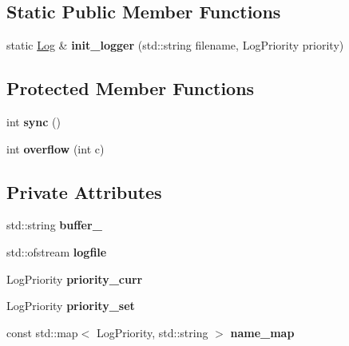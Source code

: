 \subsection*{Static Public Member Functions}
\begin{DoxyCompactItemize}
\item 
\hypertarget{classfv_1_1util_1_1Log_a8232233797affe8abc97d4b6e0b3b917}{}\label{classfv_1_1util_1_1Log_a8232233797affe8abc97d4b6e0b3b917} 
static \hyperlink{classfv_1_1util_1_1Log}{Log} \& {\bfseries init\+\_\+logger} (std\+::string filename, Log\+Priority priority)
\end{DoxyCompactItemize}
\subsection*{Protected Member Functions}
\begin{DoxyCompactItemize}
\item 
\hypertarget{classfv_1_1util_1_1Log_a133ed49ae8fc4cf3e2d511d0d9e28c94}{}\label{classfv_1_1util_1_1Log_a133ed49ae8fc4cf3e2d511d0d9e28c94} 
int {\bfseries sync} ()
\item 
\hypertarget{classfv_1_1util_1_1Log_ad871974b451c4c5d6dc9ef40af56c5af}{}\label{classfv_1_1util_1_1Log_ad871974b451c4c5d6dc9ef40af56c5af} 
int {\bfseries overflow} (int c)
\end{DoxyCompactItemize}
\subsection*{Private Attributes}
\begin{DoxyCompactItemize}
\item 
\hypertarget{classfv_1_1util_1_1Log_a367cd2434a71d3d0c31eca4fa669863f}{}\label{classfv_1_1util_1_1Log_a367cd2434a71d3d0c31eca4fa669863f} 
std\+::string {\bfseries buffer\+\_\+}
\item 
\hypertarget{classfv_1_1util_1_1Log_a228072e981f6e3061c574bf44123119b}{}\label{classfv_1_1util_1_1Log_a228072e981f6e3061c574bf44123119b} 
std\+::ofstream {\bfseries logfile}
\item 
\hypertarget{classfv_1_1util_1_1Log_a82bba61e99e82b3b08eb1db2a266b1e3}{}\label{classfv_1_1util_1_1Log_a82bba61e99e82b3b08eb1db2a266b1e3} 
Log\+Priority {\bfseries priority\+\_\+curr}
\item 
\hypertarget{classfv_1_1util_1_1Log_a741292d02499b1f9bef04739e0971faa}{}\label{classfv_1_1util_1_1Log_a741292d02499b1f9bef04739e0971faa} 
Log\+Priority {\bfseries priority\+\_\+set}
\item 
const std\+::map$<$ Log\+Priority, std\+::string $>$ {\bfseries name\+\_\+map}
\end{DoxyCompactItemize}
